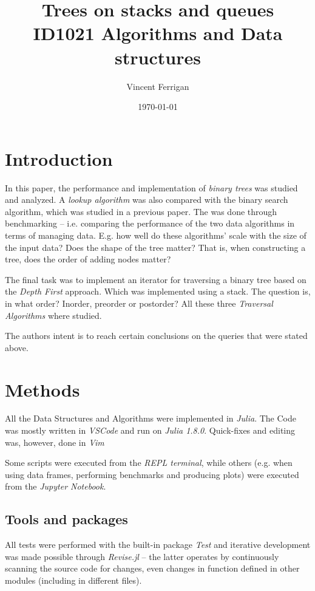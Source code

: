 \documentclass[a4paper, 11pt]{article}
\title{Trees on stacks and queues\\ \small{ID1021 Algorithms and Data structures}} %
\author{Vincent Ferrigan}
\date{\today}
\begin{document}
    \maketitle
    \section*{Introduction}
    In this paper, the performance and implementation of \emph{binary trees} 
    was studied and analyzed. A \emph{lookup algorithm} was also compared with
    the binary search algorithm, which was studied in a previous paper. 
    The was done through benchmarking -- i.e. comparing the performance of
    the two data algorithms in terms of managing data. E.g. how well do these
    algorithms' scale with the size of the input data? 
    Does the shape of the tree matter? That is, when 
    constructing a tree, does the order of adding nodes matter?

    The final task was to implement an iterator for traversing a binary tree 
    based on the \emph{Depth First} approach. Which was implemented using a stack. 
    The question is, in what order? Inorder, preorder or postorder? 
    All these three \emph{Traversal Algorithms} where studied. 
    
    The authors intent is to reach certain conclusions on the queries that were
    stated above. 
    
    \section*{Methods}
    All the Data Structures and Algorithms were implemented in \emph{Julia}.
    The Code was mostly written in \emph{VSCode} and run on \emph{Julia 1.8.0}.
    Quick-fixes and editing was, however, done in \emph{Vim}

    Some scripts were executed from the \emph{REPL terminal},  while others (e.g.
    when using data frames, performing benchmarks and producing plots) were executed from the
    \emph{Jupyter Notebook}. 
    
    \subsection*{Tools and packages}
    All tests were performed with the built-in package \emph{Test} and iterative development
    was made possible through \emph{Revise.jl} -- the latter operates by continuously
    scanning the source code for changes, even changes in function defined in
    other modules (including in different files).
    
\end{document}
